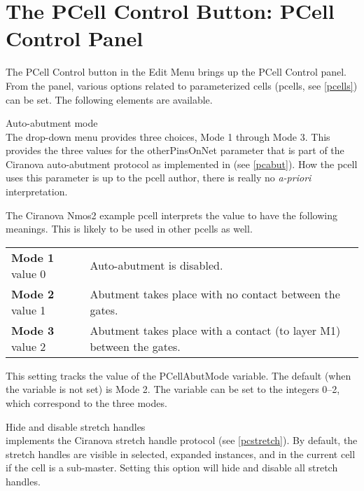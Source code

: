 \section{The {\cb PCell Control} Button: PCell Control Panel}
The {\cb PCell Control} button in the {\cb Edit Menu} brings up the
{\cb PCell Control} panel.  From the panel, various options related to
parameterized cells (pcells, see \ref{pcells}) can be set.  The
following elements are available.

\begin{description}
\item{\cb Auto-abutment mode}\\
The drop-down menu provides three choices, {\cb Mode 1} through {\cb
Mode 3}.  This provides the three values for the {\et otherPinsOnNet}
parameter that is part of the Ciranova auto-abutment protocol as
implemented in {\Xic} (see \ref{pcabut}).  How the pcell uses this
parameter is up to the pcell author, there is really no {\it a-priori}
interpretation.

The Ciranova {\et Nmos2} example pcell interprets the value to
have the following meanings.  This is likely to be used in other
pcells as well.

\begin{tabular}{ll}\\
{\bf Mode 1} value 0 & Auto-abutment is disabled.\\
{\bf Mode 2} value 1 & Abutment takes place with no contact between
  the gates.\\
{\bf Mode 3} value 2 & Abutment takes place with a contact (to layer M1)
  between the gates.\\
\end{tabular}

This setting tracks the value of the {\et PCellAbutMode} variable. 
The default (when the variable is not set) is Mode 2.  The variable
can be set to the integers 0--2, which correspond to the three modes.

\item{\cb Hide and disable stretch handles}\\
{\Xic} implements the Ciranova stretch handle protocol (see
\ref{pcstretch}).  By default, the stretch handles are visible in
selected, expanded instances, and in the current cell if the cell is a
sub-master.  Setting this option will hide and disable all stretch
handles.


\end{description}
